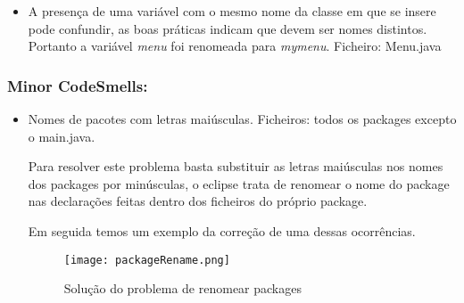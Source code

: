 \begin{itemize}
\item A presença de uma variável com o mesmo nome da classe em que se insere pode confundir, as boas práticas indicam que devem ser nomes distintos. Portanto a variável \textit{menu} foi renomeada para \textit{mymenu}. \newline
Ficheiro: Menu.java \newline

\end{itemize}

\subsubsection{Minor CodeSmells:}
\begin{itemize}
\item Nomes de pacotes com letras maiúsculas.\newline
 Ficheiros: todos os packages excepto o main.java.\newline


\par Para resolver este problema basta substituir as letras maiúsculas nos nomes dos packages por minúsculas, o eclipse trata de renomear o nome do package nas declarações feitas dentro dos ficheiros do próprio package.\newline
\par Em seguida temos um exemplo da correção de uma dessas ocorrências. 
\begin{figure}[H]

  \centering

  \texttt{[image: packageRename.png]}

  \caption {Solução do problema de renomear packages}

  \label {fig16}

\end{figure}

\end{itemize}

